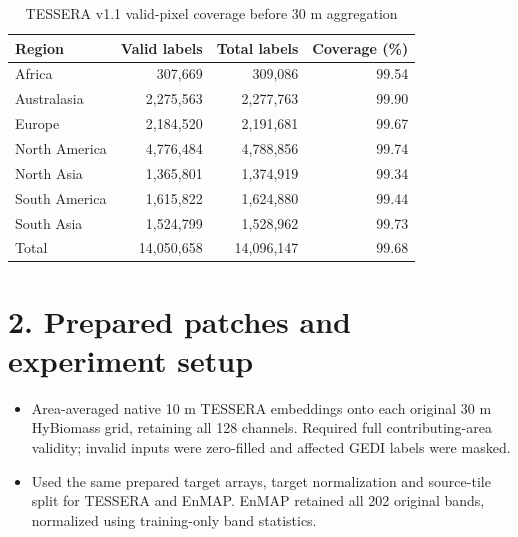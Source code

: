 \documentclass[11pt]{article}
\begin{document}
\begin{table}[H]
	\centering
	\caption{TESSERA v1.1 valid-pixel coverage before 30 m aggregation}
	\small
	\begin{tabular}{@{}lrrr@{}}
		\toprule
		Region        & Valid labels & Total labels & Coverage (\%) \\
		\midrule
		Africa        & 307,669      & 309,086      & 99.54         \\
		Australasia   & 2,275,563    & 2,277,763    & 99.90         \\
		Europe        & 2,184,520    & 2,191,681    & 99.67         \\
		North America & 4,776,484    & 4,788,856    & 99.74         \\
		North Asia    & 1,365,801    & 1,374,919    & 99.34         \\
		South America & 1,615,822    & 1,624,880    & 99.44         \\
		South Asia    & 1,524,799    & 1,528,962    & 99.73         \\
		\midrule
		Total         & 14,050,658   & 14,096,147   & 99.68         \\
		\bottomrule
	\end{tabular}
\end{table}

\section*{2. Prepared patches and experiment setup}
\begin{itemize}
	\item Area-averaged native 10 m TESSERA embeddings onto each original 30 m HyBiomass grid, retaining all 128 channels. Required full contributing-area validity; invalid inputs were zero-filled and affected GEDI labels were masked.
	\item Used the same prepared target arrays, target normalization and source-tile split for TESSERA and EnMAP. EnMAP retained all 202 original bands, normalized using training-only band statistics.
\end{itemize}
\end{document}
